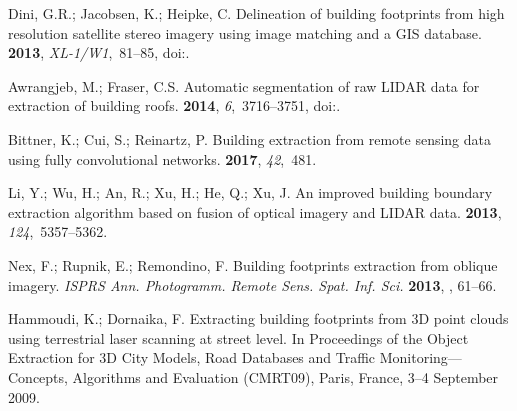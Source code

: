 \documentclass[remotesensing,article,accept,moreauthors,pdftex,10pt,a4paper]{mdpi}
\theoremstyle{mdpi}
\newcounter{thm}
\newcounter{ex}
\newcounter{re}
\begin{document}
\begin{thebibliography}{999}
Dini, G.R.; Jacobsen, K.; Heipke, C.
\newblock Delineation of building footprints from high resolution satellite
  stereo imagery using image matching and a GIS database.
 {\bf 2013}, {\em XL-1/W1},~81--85,
\newblock
  doi:{\href{https://doi.org/10.5194/isprsarchives-XL-1-W1-81-2013}{}}.


Awrangjeb, M.; Fraser, C.S.
\newblock Automatic segmentation of raw LIDAR data for extraction of building
  roofs.
 {\bf 2014}, {\em 6},~3716--3751,
\newblock
  doi:{\href{https://doi.org/10.3390/rs6053716}{}}.

Bittner, K.; Cui, S.; Reinartz, P.
\newblock Building extraction from remote sensing data using fully
  convolutional networks.
 {\bf 2017}, {\em 42},~481.

Li, Y.; Wu, H.; An, R.; Xu, H.; He, Q.; Xu, J.
\newblock An improved building boundary extraction algorithm based on fusion of
  optical imagery and LIDAR data.
  {\bf 2013}, {\em 124},~5357--5362.



Nex, F.; Rupnik, E.; Remondino, F.
\newblock Building footprints extraction from oblique imagery. \emph{ISPRS Ann. Photogramm. Remote Sens. Spat. Inf. Sci.} {\bf 2013},
, 61--66.

Hammoudi, K.; Dornaika, F.
\newblock Extracting building footprints from 3D point clouds using terrestrial
  laser scanning at street level. In Proceedings of the Object Extraction for 3D City Models, Road Databases and Traffic Monitoring---Concepts, Algorithms and Evaluation (CMRT09), Paris, France, 3--4 September 2009.



\end{thebibliography}
\end{document}
